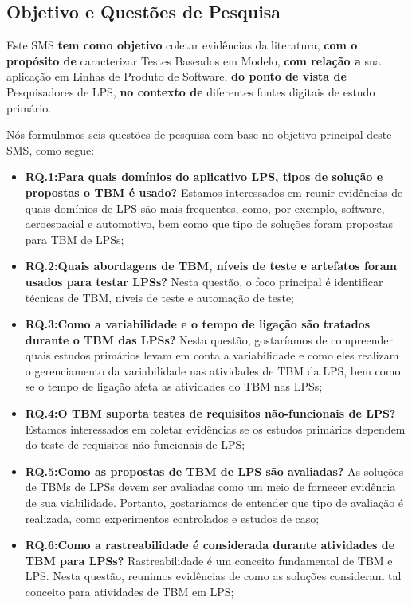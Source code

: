 \subsection{Objetivo e Questões de Pesquisa}
\label{sec:research_questions}

Este SMS \textbf{tem como objetivo} coletar evidências da literatura, \textbf{com o propósito de} caracterizar Testes Baseados em Modelo, \textbf{com relação a} sua aplicação em Linhas de Produto de Software, \textbf{do ponto de vista de} Pesquisadores de LPS, \textbf{no contexto de} diferentes fontes digitais de estudo primário.

Nós formulamos seis questões de pesquisa com base no objetivo principal deste SMS, como segue:

\begin{itemize}
	
	\item \textbf{RQ.1:Para quais domínios do aplicativo LPS, tipos de solução e propostas o TBM é usado?}%
	Estamos interessados em reunir evidências de quais domínios de LPS são mais frequentes, como, por exemplo, software, aeroespacial e automotivo, bem como que tipo de soluções foram propostas para TBM de LPSs;
	
	\item \textbf{RQ.2:Quais abordagens de TBM, níveis de teste e artefatos foram usados para testar LPSs?} Nesta questão, o foco principal é identificar técnicas de TBM, níveis de teste e automação de teste;
	
	\item \textbf{RQ.3:Como a variabilidade e o tempo de ligação são tratados durante o TBM das LPSs?}%
	Nesta questão, gostaríamos de compreender quais estudos primários levam em conta a variabilidade e como eles realizam o gerenciamento da variabilidade nas atividades de TBM da LPS, bem como se o tempo de ligação afeta as atividades do TBM nas LPSs;
	
	\item \textbf{RQ.4:O TBM suporta testes de requisitos não-funcionais de LPS?} Estamos interessados em coletar evidências se os estudos primários dependem do teste de requisitos não-funcionais de LPS;
	
	\item \textbf{RQ.5:Como as propostas de TBM de LPS são avaliadas?} As soluções de TBMs de LPSs devem ser avaliadas como um meio de fornecer evidência de sua viabilidade. Portanto, gostaríamos de entender que tipo de avaliação é realizada, como experimentos controlados e estudos de caso;
	
	\item \textbf{RQ.6:Como a rastreabilidade é considerada durante atividades de TBM para LPSs?} Rastreabilidade é um conceito fundamental de TBM e LPS. Nesta questão, reunimos evidências de como as soluções consideram tal conceito para atividades de TBM em LPS;
	
\end{itemize}

